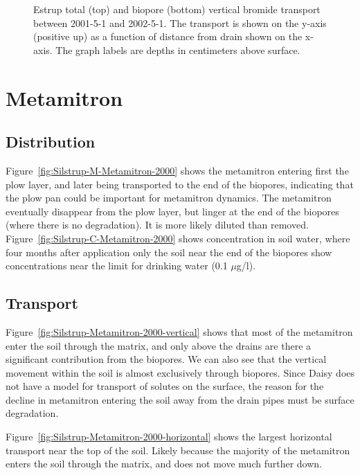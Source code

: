 \begin{figure}[htbp]
  \centering
  
  \caption{Estrup total (top) and biopore (bottom) vertical bromide
    transport between 2001-5-1 and 2002-5-1.  The transport is shown on the
    y-axis (positive up) as a function of distance from drain shown on
    the x-axis.  The graph labels are depths in centimeters above
    surface.}
  \label{fig:Estrup-Bromide-2001-vertical}
\end{figure}

\FloatBarrier
\section{Metamitron}

\subsection{Distribution}

Figure~\ref{fig:Silstrup-M-Metamitron-2000} shows the metamitron
entering first the plow layer, and later being transported to the end
of the biopores, indicating that the plow pan could be important for
metamitron dynamics.  The metamitron eventually disappear from the
plow layer, but linger at the end of the biopores (where there is no
degradation).  It is more likely diluted than removed.
Figure~\ref{fig:Silstrup-C-Metamitron-2000} shows concentration in soil
water, where four months after application only the soil near the end
of the biopores show concentrations near the limit for drinking water
(0.1 $\mu$g/l).

\subsection{Transport}


Figure~\ref{fig:Silstrup-Metamitron-2000-vertical} shows that most of
the metamitron enter the soil through the matrix, and only above the
drains are there a significant contribution from the biopores. We can
also see that the vertical movement within the soil is almost
exclusively through biopores.  Since Daisy does not have a model for
transport of solutes on the surface, the reason for the decline in
metamitron entering the soil away from the drain pipes must be surface
degradation.

Figure~\ref{fig:Silstrup-Metamitron-2000-horizontal} shows the largest
horizontal transport near the top of the soil.  Likely because the majority
of the metamitron enters the soil through the matrix, and does not
move much further down.


